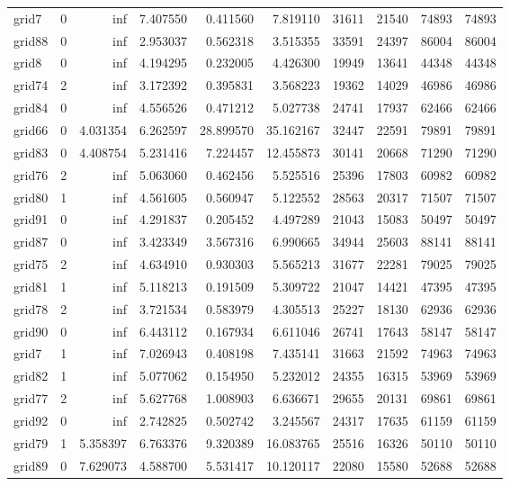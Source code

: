 \begin{longtable}{|l|r|r|r|r|r|r|r|r|r|}
grid7 & 0 & inf & 7.407550 & 0.411560 & 7.819110 & 31611 & 21540 & 74893 & 74893 \\
grid88 & 0 & inf & 2.953037 & 0.562318 & 3.515355 & 33591 & 24397 & 86004 & 86004 \\
grid8 & 0 & inf & 4.194295 & 0.232005 & 4.426300 & 19949 & 13641 & 44348 & 44348 \\
grid74 & 2 & inf & 3.172392 & 0.395831 & 3.568223 & 19362 & 14029 & 46986 & 46986 \\
grid84 & 0 & inf & 4.556526 & 0.471212 & 5.027738 & 24741 & 17937 & 62466 & 62466 \\
grid66 & 0 & 4.031354 & 6.262597 & 28.899570 & 35.162167 & 32447 & 22591 & 79891 & 79891 \\
grid83 & 0 & 4.408754 & 5.231416 & 7.224457 & 12.455873 & 30141 & 20668 & 71290 & 71290 \\
grid76 & 2 & inf & 5.063060 & 0.462456 & 5.525516 & 25396 & 17803 & 60982 & 60982 \\
grid80 & 1 & inf & 4.561605 & 0.560947 & 5.122552 & 28563 & 20317 & 71507 & 71507 \\
grid91 & 0 & inf & 4.291837 & 0.205452 & 4.497289 & 21043 & 15083 & 50497 & 50497 \\
grid87 & 0 & inf & 3.423349 & 3.567316 & 6.990665 & 34944 & 25603 & 88141 & 88141 \\
grid75 & 2 & inf & 4.634910 & 0.930303 & 5.565213 & 31677 & 22281 & 79025 & 79025 \\
grid81 & 1 & inf & 5.118213 & 0.191509 & 5.309722 & 21047 & 14421 & 47395 & 47395 \\
grid78 & 2 & inf & 3.721534 & 0.583979 & 4.305513 & 25227 & 18130 & 62936 & 62936 \\
grid90 & 0 & inf & 6.443112 & 0.167934 & 6.611046 & 26741 & 17643 & 58147 & 58147 \\
grid7 & 1 & inf & 7.026943 & 0.408198 & 7.435141 & 31663 & 21592 & 74963 & 74963 \\
grid82 & 1 & inf & 5.077062 & 0.154950 & 5.232012 & 24355 & 16315 & 53969 & 53969 \\
grid77 & 2 & inf & 5.627768 & 1.008903 & 6.636671 & 29655 & 20131 & 69861 & 69861 \\
grid92 & 0 & inf & 2.742825 & 0.502742 & 3.245567 & 24317 & 17635 & 61159 & 61159 \\
grid79 & 1 & 5.358397 & 6.763376 & 9.320389 & 16.083765 & 25516 & 16326 & 50110 & 50110 \\
grid89 & 0 & 7.629073 & 4.588700 & 5.531417 & 10.120117 & 22080 & 15580 & 52688 & 52688 \\

\end{longtable}
